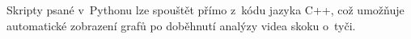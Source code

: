 Skripty psané v~Pythonu lze spouštět přímo z~kódu jazyka C++, což umožňuje automatické zobrazení grafů po doběhnutí analýzy videa skoku o~tyči.

































